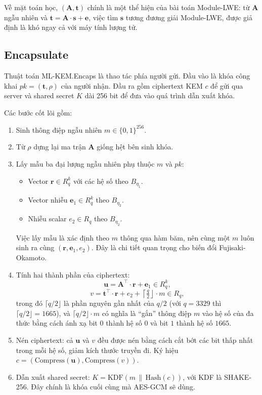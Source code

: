 Về mặt toán học, $(\mathbf{A}, \mathbf{t})$ chính là một thể hiện của bài toán Module-LWE: từ $\mathbf{A}$ ngẫu nhiên và $\mathbf{t} = \mathbf{A} \cdot \mathbf{s} + \mathbf{e}$, việc tìm $\mathbf{s}$ tương đương giải Module-LWE, được giả định là khó ngay cả với máy tính lượng tử.

\subsection{Encapsulate}

Thuật toán ML-KEM.Encaps là thao tác phía người gửi. Đầu vào là khóa công khai $pk = (\mathbf{t}, \rho)$ của người nhận. Đầu ra gồm ciphertext KEM $c$ để gửi qua server và shared secret $K$ dài 256 bit để đưa vào quá trình dẫn xuất khóa. 

Các bước cốt lõi gồm:

\begin{enumerate}
    \item Sinh thông điệp ngẫu nhiên $m \in \{0,1\}^{256}$.
    \item Từ $\rho$ dựng lại ma trận $\mathbf{A}$ giống hệt bên sinh khóa.
    \item Lấy mẫu ba đại lượng ngẫu nhiên phụ thuộc $m$ và $pk$:
    \begin{itemize}
        \item Vector $\mathbf{r} \in R_q^k$ với các hệ số theo $B_{\eta_1}$.
        \item Vector nhiễu $\mathbf{e}_1 \in R_q^k$ theo $B_{\eta_2}$.
        \item Nhiễu scalar $e_2 \in R_q$ theo $B_{\eta_2}$.
    \end{itemize}
    Việc lấy mẫu là xác định theo $m$ thông qua hàm băm, nên cùng một $m$ luôn sinh ra cùng $(\mathbf{r}, \mathbf{e}_1, e_2)$. Đây là chi tiết quan trọng cho biến đổi Fujisaki-Okamoto.
    \item Tính hai thành phần của ciphertext:
    \[
    \mathbf{u} = \mathbf{A}^{\top} \cdot \mathbf{r} + \mathbf{e}_1 \in R_q^k,
    \]
    \[
    v = \mathbf{t}^{\top} \cdot \mathbf{r} + e_2 + \left\lceil \tfrac{q}{2} \right\rfloor \cdot m \in R_q,
    \]
    trong đó $\lceil q/2 \rfloor$ là phần nguyên gần nhất của $q/2$ (với $q = 3329$ thì $\lceil q/2 \rfloor = 1665$), và $\lceil q/2 \rfloor \cdot m$ có nghĩa là ``gắn'' thông điệp $m$ vào hệ số của đa thức bằng cách ánh xạ bit $0$ thành hệ số $0$ và bit $1$ thành hệ số $1665$.
    \item Nén ciphertext: cả $\mathbf{u}$ và $v$ đều được nén bằng cách cắt bớt các bit thấp nhất trong mỗi hệ số, giảm kích thước truyền đi. Ký hiệu $c = (\text{Compress}(\mathbf{u}), \text{Compress}(v))$.
    \item Dẫn xuất shared secret: $K = \text{KDF}(m \,\|\, \text{Hash}(c))$, với KDF là SHAKE-256. Đây chính là khóa cuối cùng mà AES-GCM sẽ dùng.
\end{enumerate}

